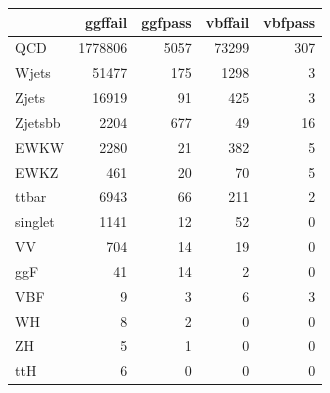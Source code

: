 \begin{tabular}{lrrrr}
\toprule
 & ggffail & ggfpass & vbffail & vbfpass \\
\midrule
QCD & 1778806 & 5057 & 73299 & 307 \\
Wjets & 51477 & 175 & 1298 & 3 \\
Zjets & 16919 & 91 & 425 & 3 \\
Zjetsbb & 2204 & 677 & 49 & 16 \\
EWKW & 2280 & 21 & 382 & 5 \\
EWKZ & 461 & 20 & 70 & 5 \\
ttbar & 6943 & 66 & 211 & 2 \\
singlet & 1141 & 12 & 52 & 0 \\
VV & 704 & 14 & 19 & 0 \\
ggF & 41 & 14 & 2 & 0 \\
VBF & 9 & 3 & 6 & 3 \\
WH & 8 & 2 & 0 & 0 \\
ZH & 5 & 1 & 0 & 0 \\
ttH & 6 & 0 & 0 & 0 \\
\bottomrule
\end{tabular}
